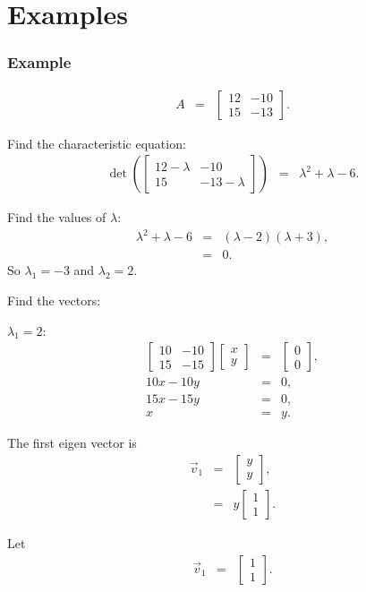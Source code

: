 \documentclass{beamer}
\newcommand{\lp}{\left(}
\newcommand{\rp}{\right)}
\newcommand{\arrayTwo}[4]{
  \left[
  \begin{array}{rr}
    #1 & #2 \\
    #3 & #4
  \end{array}
  \right]
}
\newcommand{\vecTwo}[2]{
  \left[
  \begin{array}{r}
    #1 \\  #2
  \end{array}
  \right]
}
\begin{document}
\section{Examples}

\begin{frame}
  \frametitle{Example}

  \begin{eqnarray*}
    A & = & \arrayTwo{12}{-10}{15}{-13}.
  \end{eqnarray*}

  Find the characteristic equation:
  \begin{eqnarray*}
    \det\lp\arrayTwo{12-\lambda}{-10}{15}{-13-\lambda}\rp & = & \lambda^2+\lambda-6.
  \end{eqnarray*}

  Find the values of $\lambda$:
  \begin{eqnarray*}
    \lambda^2+\lambda-6 & = & (\lambda-2)(\lambda+3), \\
    & = & 0.
  \end{eqnarray*}
  So $\lambda_1 = -3$ and $\lambda_2=2$.

\end{frame}


\begin{frame}
  Find the vectors:

  $\lambda_1 = 2$:
  \begin{eqnarray*}
    \arrayTwo{10}{-10}{15}{-15} \vecTwo{x}{y} & = & \vecTwo{0}{0}, \\
    10x - 10y & = & 0, \\
    15x - 15y & = & 0, \\
    x & = & y.
  \end{eqnarray*}

  The first eigen vector is 
  \begin{eqnarray*}
    \vec{v}_1 & = & \vecTwo{y}{y}, \\
    & = & y \vecTwo{1}{1}.
  \end{eqnarray*}

  Let
  \begin{eqnarray*}
    \vec{v}_1 & = & \vecTwo{1}{1}.
  \end{eqnarray*}

\end{frame}
\end{document}
